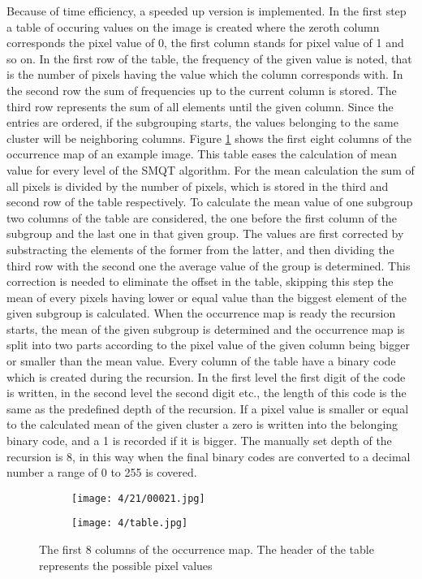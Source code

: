 \documentclass[draft,final]{vutinfth} %
\begin{document}
Because of time efficiency, a speeded up version is implemented.
In the first step a table of occuring values on the image is created where the zeroth column corresponds the pixel value of 0, the first column stands for pixel value of 1 and so on.
In the first row of the table, the frequency of the given value is noted, that is the number of pixels having the value which the column corresponds with.
In the second row the sum of frequencies up to the current column is stored.
The third row represents the sum of all elements until the given column.
Since the entries are ordered, if the subgrouping starts, the values belonging to the same cluster will be neighboring columns.
Figure \ref{fig:fans:table} shows the first eight columns of the occurrence map of an example image.
This table eases the calculation of mean value for every level of the SMQT algorithm.
For the mean calculation the sum of all pixels is divided by the number of pixels, which is stored in the third and second row of the table respectively. 
To calculate the mean value of one subgroup two columns of the table are considered, the one before the first column of the subgroup and the last one in that given group.
The values are first corrected by substracting the elements of the former from the latter, and then dividing the third row with the second one the average value of the group is determined.
This correction is needed to eliminate the offset in the table, skipping this step the mean of every pixels having lower or equal value than the biggest element of the given subgroup is calculated.
When the occurrence map is ready the recursion starts, the mean of the given subgroup is determined and the occurrence map is split into two parts according to the pixel value of the given column being bigger or smaller than the mean value. 
Every column of the table have a binary code which is created during the recursion.
In the first level the first digit of the code is written, in the second level the second digit etc., the length of this code is the same as the predefined depth of the recursion.
If a pixel value is smaller or equal to the calculated mean of the given cluster a zero is written into the belonging binary code, and a 1 is recorded if it is bigger.
The manually set depth of the recursion is 8, in this way when the final binary codes are converted to a decimal number a range of 0 to 255 is covered.
\begin{figure}[h]
  \centering
  \begin{subfigure}[t]{0.09\columnwidth}
    \centering
    \texttt{[image: 4/21/00021.jpg]}
  \end{subfigure}
  \begin{subfigure}[t]{0.9\columnwidth}
    \centering
    \texttt{[image: 4/table.jpg]}
  \end{subfigure}
  \caption{The first 8 columns of the occurrence map. The header of the table represents the possible pixel values }
  \label{fig:fans:table} %
\end{figure}
\end{document}
